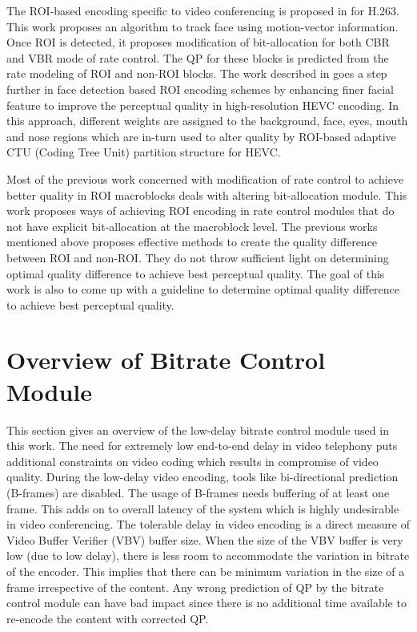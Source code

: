 \documentclass[11pt]{article} %
\begin{document}
The ROI-based encoding specific to video conferencing is proposed in \cite{ROI-MV-based-face-tracking} for H.263. This work proposes an algorithm to track face using motion-vector information. Once ROI is detected, it proposes modification of bit-allocation for both CBR and VBR mode of rate control. The QP for these blocks is predicted from the rate modeling of ROI and non-ROI blocks. The work described in \cite{Perception-model-of-face} goes a step further in face detection based ROI encoding schemes by enhancing finer facial feature to improve the perceptual quality in high-resolution HEVC encoding. In this approach, different weights are assigned to the background, face, eyes, mouth and nose regions which are in-turn used to alter quality by ROI-based adaptive CTU (Coding Tree Unit) partition structure for HEVC.

Most of the previous work concerned with modification of rate control to achieve better quality in ROI macroblocks deals with altering bit-allocation module. This work proposes ways of achieving ROI encoding in rate control modules that do not have explicit bit-allocation at the macroblock level. The previous works mentioned above proposes effective methods to create the quality difference between ROI and non-ROI. They do not throw sufficient light on determining optimal quality difference to achieve best perceptual quality. The goal of this work is also to come up with a guideline to determine optimal quality difference to achieve best perceptual quality.

\section{Overview of Bitrate Control Module} \label{sec:used-bitrate-control-overview}
This section gives an overview of the low-delay bitrate control module used in this work. The need for extremely low end-to-end delay in video telephony puts additional constraints on video coding which results in compromise of video quality. During the low-delay video encoding, tools like bi-directional prediction (B-frames) are disabled. The usage of B-frames needs buffering of at least one frame. This adds on to overall latency of the system which is highly undesirable in video conferencing. The tolerable delay in video encoding is a direct measure of Video Buffer Verifier (VBV) buffer size. When the size of the VBV buffer is very low (due to low delay), there is less room to accommodate the variation in bitrate of the encoder. This implies that there can be minimum variation in the size of a frame irrespective of the content. Any wrong prediction of QP by the bitrate control module can have bad impact since there is no additional time available to re-encode the content with corrected QP. 
 
\end{document}
